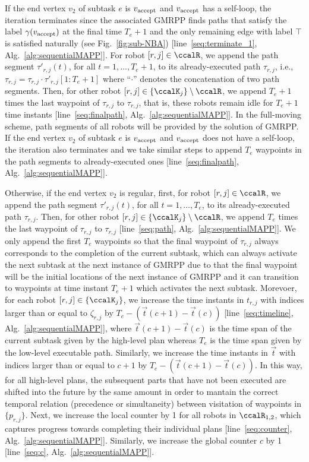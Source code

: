 \documentclass[Afour,sageh,times]{sagej}
\newcommand{\vertex}[1]{v_{\textup{#1}}}
\begin{document}
{{{{If the  end vertex $v_2$ of subtask $e$ is $\vertex{accept}$ and $\vertex{accept}$ has a self-loop, the iteration terminates since the associated GMRPP finds paths that satisfy the label $\gamma(\vertex{accept})$ at the final time $T_e + 1$ and the only remaining edge with label $\top$ is satisfied naturally (see Fig.~\ref{fig:sub-NBA}) [line~\ref{seq:terminate_1}, Alg.~\ref{alg:sequentialMAPP}]. For robot $[r, j] \in \ccalR$, we append the path segment $\tau'_{r,j}(t)$, for all $t = 1, \ldots, T_e+1$, to its already-executed path $\tau_{r,j}$, i.e.,  $\tau_{r,j} = \tau_{r,j} \cdot \tau'_{r,j}[1:T_e+1]$ where ``$\cdot$'' denotes the concatenation of two path segments. Then, for other robot $[r,j] \in \{\ccalK_j\}\setminus \ccalR$, we  append  $T_e+1$ times  the last waypoint of  $\tau_{r,j}$  to $\tau_{r,j}$, that is, these robots  remain idle for $T_e+1$ time instants [line~\ref{seq:finalpath}, Alg.~\ref{alg:sequentialMAPP}]. In the full-moving scheme, path segments of all robots will be provided by the solution of GMRPP. If the  end vertex $v_2$ of subtask $e$ is $\vertex{accept}$ and $\vertex{accept}$ does not have a self-loop, the iteration also terminates and  we take similar steps to append $T_e$ waypoints in the path segments to already-executed ones [line~\ref{seq:finalpath}, Alg.~\ref{alg:sequentialMAPP}].

Otherwise, if the end vertex $v_2$ is regular, first, for robot $[r, j] \in \ccalR$, we append the path segment $\tau'_{r,j}(t)$, for all $t=1,\ldots, T_e$, to its already-executed path $\tau_{r,j}$. Then, for other robot $[r,j] \in \{\ccalK_j\}\setminus \ccalR$, we  append  $T_e$ times the last waypoint of  $\tau_{r,j}$  to $\tau_{r,j}$ [line~\ref{seq:path}, Alg.~\ref{alg:sequentialMAPP}]. We only append the first $T_e$ waypoints so that the final waypoint of $\tau_{r,j}$ always corresponds to the completion of the current  subtask, which can always activate the next subtask at the next instance of GMRPP due to that the final waypoint will be the initial locations of the next instance of GMRPP and it  can transition to waypoints at time instant $T_e+1$ which activates the next subtask.  Morevoer, for each robot $[r,j] \in \{\ccalK_j\}$, we increase the time instants in $t_{r,j}$ with indices larger than or equal to  $\zeta_{r,j}$ by $T_e - (\vec{t}(c+1) - \vec{t}(c))$ [line~\ref{seq:timeline}, Alg.~\ref{alg:sequentialMAPP}], where $\vec{t}(c+1) - \vec{t}(c)$ is the time span of the current subtask  given by the high-level plan whereas $T_e$ is the time span given by the low-level executable path.
    Similarly, we increase the time instants in $\vec{t}$ with indices larger than or equal to  $c+1$ by $T_e - (\vec{t}(c+1)- \vec{t}(c))$.
    In this way, for all high-level plans, the subsequent parts that have not been executed are shifted into the future by the same amount in order to mantain the correct temporal relation (precedence or simultaneity) between visitation of waypoints in $\{p_{r,j}\}$. Next, we increase  the local counter by 1 for all robots in $\ccalR_{1,2}$, which captures progress towards completing their individual plans [line~\ref{seq:counter}, Alg.~\ref{alg:sequentialMAPP}]. Similarly, we increase the global counter $c$ by 1 [line~\ref{seq:c}, Alg.~\ref{alg:sequentialMAPP}].}


}}}
\end{document}
